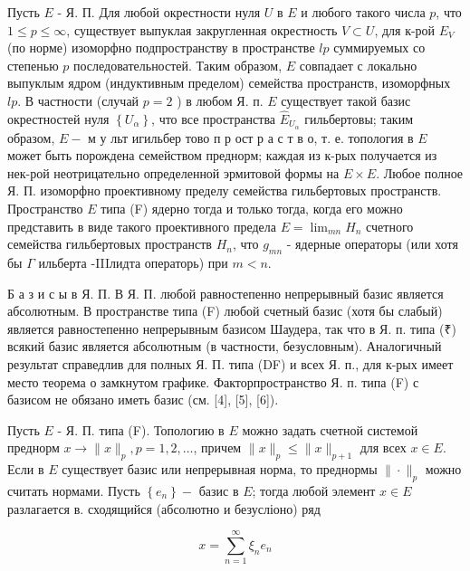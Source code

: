 \documentclass[10pt]{article}
\begin{document}
Пусть $E$ - Я. П. Для любой окрестности нуля $U$ в $E$ и любого такого числа $p$, что $1 \leqslant p \leqslant \infty$, существует выпуклая закругленная окрестность $V \subset U$, для к-рой $E_{V}$ (по норме) изоморфно подпространству в пространстве $l p$ суммируемых со степенью $p$ последовательностей. Таким образом, $E$ совпадает с локально выпуклым ядром (индуктивным пределом) семейства пространств, изоморфных $l p$. В частности (случай $p=2$ ) в любом Я. п. $E$ существует такой базис окрестностей нуля $\left\{U_{\alpha}\right\}$, что все пространства $\hat{E}_{U_{\alpha}}$ гильбертовы; таким образом, $E-$ м у льт игильбер тово п р ост р а с т в о, т. е. топология в $E$ может быть порождена семейством преднорм; каждая из к-рых получается из нек-рой неотрицательно определенной эрмитовой формы на $E \times E$. Любое полное Я. П. изоморфно проективному пределу семейства гильбертовых пространств. Пространство $E$ типа (F) ядерно тогда и только тогда, когда его можно представить в виде такого проективного предела $E=\lim _{m n} H_{n}$ счетного семейства гильбертовых пространств $H_{n}$, что $g_{m n}$ - ядерные операторы (или хотя бы $\Gamma$ ильберта -IIIлидта операторь) при $m<n$.



Б а з и с ы в Я. П. В Я. П. любой равностепенно непрерывный базис является абсолютным. В пространстве типа (F) любой счетный базис (хотя бы слабый) является равностепенно непрерывным базисом Шаудера, так что в Я. п. типа (₹) всякий базис является абсолютным (в частности, безусловным). Аналогичный результат справедлив для полных Я. П. типа (DF) и всех Я. п., для к-рых имеет место теорема о замкнутом графике. Факторпространство Я. п. типа (F) с базисом не обязано иметь базис (см. [4], [5], [6]).



Пусть $E$ - Я. П. типа (F). Топологию в $E$ можно задать счетной системой преднорм $x \longrightarrow\|x\|_{p}, p=1,2, \ldots$, причем $\|x\|_{p} \leqslant\|x\|_{p+1}$ для всех $x \in E$. Если в $E$ существует базис или непрерывная норма, то преднормы $\|\cdot\|_{p}$ можно считать нормами. Пусть $\left\{e_{n}\right\}-$ базис в $E$; тогда любой элемент $x \in E$ разлагается в. сходящийся (абсолютно и безусліоно) ряд



\[

x=\sum_{n=1}^{\infty} \xi_{n} e_{n}

\]
\end{document}
